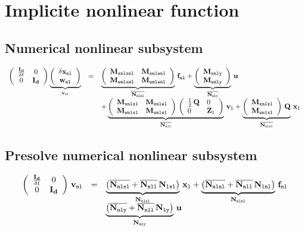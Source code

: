 \documentclass[10pt,a4paper]{article}
\begin{document}
\section{Implicite nonlinear function}
%
\subsection{Numerical nonlinear subsystem}
%
\begin{equation}
\begin{array}{rcl}
\left(
\begin{array}{cc}
\frac{\mathbf{I_d}}{\delta t} & 0 \\
0 & \mathbf{I_d}
\end{array}
\right)\underbrace{\left(\begin{array}{c}
\delta {\mathbf{x}}_{\mathtt{nl}} \\
{\mathbf{w}}_{\mathtt{nl}}
\end{array}\right) 
}_{\mathbf{v}_{\mathtt{nl}}}
&=&
  \underbrace{\left(\begin{array}{ll}
\mathbf{M}_{\mathtt{xnlxnl}}& \mathbf{M}_{\mathtt{xnlwnl}} \\ 
 \mathbf{M}_{\mathtt{wnlxnl}}& \mathbf{M}_{\mathtt{wnlwnl}} 
\end{array}\right)}_{\overline{\mathbf{N}_{\mathtt{nlnl}}}}
\,
\mathbf{f}_{\mathtt{nl}}
+
  \underbrace{\left(\begin{array}{l}
 \mathbf{M}_{\mathtt{xnly}}\\ 
 \mathbf{M}_{\mathtt{wnly}}
\end{array}\right)}_{\overline{\mathbf{N}_{\mathtt{nly}}}}
\,
{\mathbf{u}} \\
 && +
\underbrace{ \left(\begin{array}{ll}
\mathbf{M}_{\mathtt{xnlxl}}&\mathbf{M}_{\mathtt{xnlwl}} \\ 
\mathbf{M}_{\mathtt{wnlxl}}&\mathbf{M}_{\mathtt{wnlwl}} 
\end{array}\right)\,\left(\begin{array}{ll}
\frac{1}{2}\,\mathbf{Q}&0 \\ 
0 &\mathbf{Z}_{\mathtt{l}}
\end{array}\right)}_{\overline{\mathbf{N}_{\mathtt{nll}}}}
\, 
\mathbf{v}_{\mathtt{l}}
+
\underbrace{\left(\begin{array}{ll}
\mathbf{M}_{\mathtt{xnlxl}}\\ 
\mathbf{M}_{\mathtt{wnlxl}}
\end{array}\right)\,\mathbf{Q}}_{\overline{\mathbf{N}_{\mathtt{nlxl}}}}
\, 
{\mathbf{x}}_{\mathtt{l}}
\end{array}
\end{equation}
\subsection{Presolve numerical nonlinear subsystem}
\begin{equation}
\begin{array}{rcl}
\left(
\begin{array}{cc}
\frac{\mathbf{I_d}}{\delta t} & 0 \\
0 & \mathbf{I_d}
\end{array}
\right)\,
\mathbf{v}_{\mathtt{nl}} &=& \underbrace{\left(\overline{\mathbf{N}_{\mathtt{nlxl}}} + \overline{\mathbf{N}_{\mathtt{nll}}}\,{\mathbf{N}_{\mathtt{lxl}}}\right)}_{\mathbf{N}_{\mathtt{nlxl}}}\,{\mathbf{x}}_{\mathtt{l}} + \underbrace{\left(\overline{\mathbf{N}_{\mathtt{nlnl}}} + \overline{\mathbf{N}_{\mathtt{nll}}}\,{\mathbf{N}_{\mathtt{lnl}}}\right)}_{\mathbf{N}_{\mathtt{nlnl}}}\,\mathbf{f}_{\mathtt{nl}}\\
&& \underbrace{\left(\overline{\mathbf{N}_{\mathtt{nly}}}+ \overline{\mathbf{N}_{\mathtt{nll}}}\,{\mathbf{N}_{\mathtt{ly}}}\right)}_{\mathbf{N}_{\mathtt{nly}}}\,{\mathbf{u}}
\end{array}
\end{equation}
%
\end{document}

